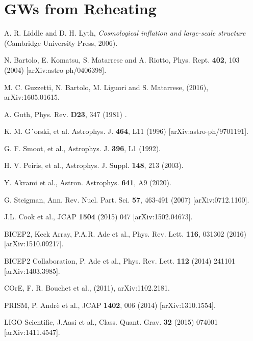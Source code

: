 \documentclass[11pt,a4paper,twoside]{book}
\begin{document}
\chapter{GWs from Reheating}






\begin{thebibliography}{2}
	
	 A. R. Liddle and D. H. Lyth, \emph{Cosmological inflation and large-scale structure} (Cambridge University Press, 2006).
	
	 N. Bartolo, E. Komatsu, S. Matarrese and A. Riotto, Phys. Rept. \textbf{402}, 103 (2004) [arXiv:astro-ph/0406398].
	
	 M. C. Guzzetti, N. Bartolo, M. Liguori and S. Matarrese, (2016), arXiv:1605.01615. 
	
	 A. Guth, Phys. Rev. \textbf{D23}, 347 (1981) .
	
	 K. M. G´orski, et al. Astrophys. J. \textbf{464}, L11 (1996) [arXiv:astro-ph/9701191].
	
	 G. F. Smoot, et al., Astrophys. J. \textbf{396}, L1 (1992).

     H. V. Peiris, et al., Astrophys. J. Suppl. \textbf{148}, 213 (2003).
	
	 Y. Akrami et al., Astron. Astrophys. \textbf{641}, A9 (2020).
	
	 G. Steigman, Ann. Rev. Nucl. Part. Sci. \textbf{57}, 463-491 (2007) [arXiv:0712.1100].
	
	 J.L. Cook et al., JCAP \textbf{1504} (2015) 047 [arXiv:1502.04673].
	
	 BICEP2, Keck Array, P.A.R. Ade et al., Phys. Rev. Lett. \textbf{116}, 031302 (2016) [arXiv:1510.09217].
	
	 BICEP2 Collaboration, P. Ade et al., Phys. Rev. Lett. \textbf{112} (2014) 241101 [arXiv:1403.3985].
	
	 COrE, F. R. Bouchet et al., (2011), arXiv:1102.2181.  
	
	 PRISM, P. Andrè et al., JCAP \textbf{1402}, 006 (2014) [arXiv:1310.1554].
	
	 LIGO Scientific, J.Aasi et al., Class. Quant. Grav. \textbf{32} (2015) 074001 [arXiv:1411.4547].
	

\end{thebibliography}
\end{document}
